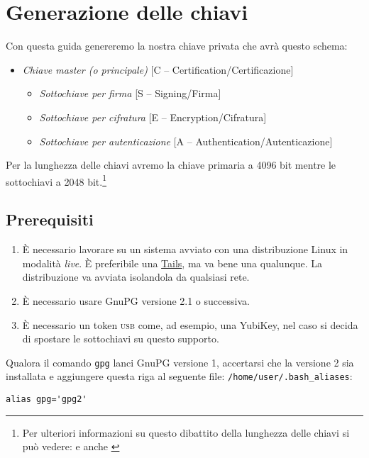 \section{Generazione delle chiavi}

Con questa guida genereremo la nostra chiave privata che avrà questo schema:

\begin{itemize}
    \item \emph{Chiave master (o principale)} [C -- Certification/Certificazione]
    \begin{itemize}
        \item \emph{Sottochiave per firma} [S -- Signing/Firma]
        \item \emph{Sottochiave per cifratura} [E -- Encryption/Cifratura]
        \item \emph{Sottochiave per autenticazione} [A --
    Authentication/Autenticazione]
    \end{itemize}
\end{itemize}

Per la lunghezza delle chiavi avremo la chiave primaria a 4096 bit
mentre le sottochiavi a 2048 bit.\footnote{Per ulteriori informazioni su questo
dibattito della lunghezza delle chiavi si può vedere: \cite{gnupg:keylength} e
anche \cite{yubico:keylength}}

\subsection{Prerequisiti}

\begin{enumerate}
 \item È necessario lavorare su un sistema avviato con una distribuzione Linux
 in modalità \textit{live}. È preferibile una
 \href{https://tails.boum.org/index.it.html}{Tails}, ma va bene una qualunque.
 La distribuzione va avviata isolandola da qualsiasi rete.
 \item È necessario usare GnuPG versione 2.1 o successiva.
 \item È necessario un token \textsc{usb} come, ad esempio, una YubiKey, nel
 caso si decida di spostare le sottochiavi su questo supporto.
\end{enumerate}

Qualora il comando \texttt{gpg} lanci GnuPG versione 1, accertarsi che
la versione 2 sia installata e aggiungere questa riga al seguente file:
\texttt{/home/user/.bash\_aliases}:

\begin{lstlisting}
alias gpg='gpg2'
\end{lstlisting}

